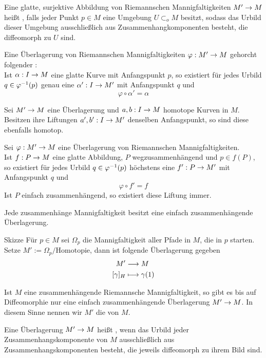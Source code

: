 \documentclass{book}
\begin{document}
\Def{}
Eine glatte, surjektive Abbildung von Riemannschen Mannigfaltigkeiten $M' \overset{}{\rightarrow} M$ heißt , falls jeder Punkt $p \in M$ eine Umgebung $U \subset_o M$ besitzt, sodass das Urbild dieser Umgebung ausschließlich aus Zusammenhangkomponenten besteht, die diffeomorph zu $U$ sind.

\Lem{}
Eine Überlagerung von Riemannschen Mannigfaltigkeiten $\varphi : M' \overset{}{\rightarrow} M$ gehorcht folgender :\\
Ist $\alpha : I \overset{}{\rightarrow} M$ eine glatte Kurve mit Anfangspunkt $p$, so existiert für jedes Urbild $q \in \varphi^{-1}(p)$ genau eine  $\alpha' : I \overset{}{\rightarrow} M'$ mit Anfangspunkt $q$ und
\[ \varphi \circ \alpha' = \alpha \]

\Lem{}
Sei $M' \overset{}{\rightarrow} M $ eine Überlagerung und $a,b : I \overset{}{\rightarrow} M$ homotope Kurven in $M$. Besitzen ihre Liftungen $a', b' : I \overset{}{\rightarrow} M'$ denselben Anfangspunkt, so sind diese ebenfalls homotop.

\Kor{}
Sei $\varphi : M' \overset{}{\rightarrow} M$ eine Überlagerung von Riemannschen Mannigfaltigkeiten.\\
Ist $f : P \overset{}{\rightarrow} M$ eine glatte Abbildung, $P$ wegzusammenhängend und $p \in f(P)$, so existiert für jedes Urbild $q \in \varphi^{-1}(p)$ höchstens eine  $f' : P \overset{}{\rightarrow} M'$ mit Anfangspunkt $q$ und
\[ \varphi \circ f' = f \]
Ist $P$ einfach zusammenhängend, so existiert diese Liftung immer.

\Satz{}
Jede zusammenhänge Mannigfaltigkeit besitzt eine einfach zusammenhängende Überlagerung.
\begin{Beweis}{Skizze}
Für $p \in M$ sei $\Omega_p$ die Mannigfaltigkeit aller Pfade in $M$, die in $p$ starten. Setze $M' := \Omega_p / \text{Homotopie}$, dann ist folgende Überlagerung gegeben
\begin{align*}
M' & \overset{}{\longrightarrow} M\\
[\gamma]_H & \longmapsto \gamma(1)
\end{align*}
\end{Beweis}

\Kor{}
Ist $M$ eine zusammenhängende Riemannsche Mannigfaltigkeit, so gibt es bis auf Diffeomorphie nur eine einfach zusammenhängende Überlagerung $M' \overset{}{\rightarrow} M$. In diesem Sinne nennen wir $M'$ die  von $M$.

\Def{}
Eine Überlagerung $M' \overset{}{\rightarrow} M$ heißt , wenn das Urbild jeder Zusammenhangskomponente von $M$ ausschließlich aus Zusammenhangskomponenten besteht, die jeweils diffeomorph zu ihrem Bild sind.
\end{document}
